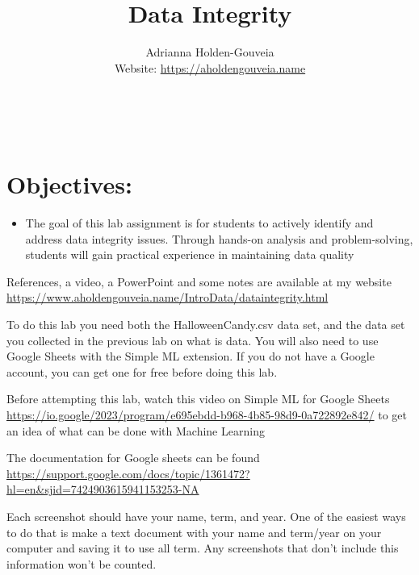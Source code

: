 \documentclass[12pt]{article}
\title{Data Integrity}
\author{
        Adrianna Holden-Gouveia \\
        Website: \url{https://aholdengouveia.name}\\ 
        \date{\vspace{-5ex}}
        \faLinkedin{: aholdengouveia} \\
        \faGithub {: aholdengouveia} \\
        }
\begin{document}
    

\maketitle


\section*{Objectives:}
\begin{itemize}
    \item The goal of this lab assignment is for students to actively identify and address data integrity issues. Through hands-on analysis and problem-solving, students will gain practical experience in maintaining data quality
\end{itemize}

References, a video, a PowerPoint and some notes are available at my website
\url {https://www.aholdengouveia.name/IntroData/dataintegrity.html}


To do this lab you need both the HalloweenCandy.csv data set, and the data set you collected in the previous lab on what is data. You will also need to use Google Sheets with the Simple ML extension.  If you do not have a Google account, you can get one for free before doing this lab.  

Before attempting this lab, watch this video on Simple ML for Google Sheets \url{https://io.google/2023/program/e695ebdd-b968-4b85-98d9-0a722892e842/} to get an idea of what can be done with Machine Learning

The documentation for Google sheets can be found \url{https://support.google.com/docs/topic/1361472?hl=en&sjid=7424903615941153253-NA}


Each screenshot should have your name, term, and year.  One of the easiest ways to do that is make a text document with your name and term/year on your computer and saving it to use all term. Any screenshots that don't include this information won't be counted.
\end{document}
